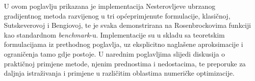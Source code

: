 U ovom poglavlju prikazana je implementacija Nesterovljeve ubrzanog gradijentnog metoda razvijenog u
tri općeprimjenute formulacije, klasičnoj, Sutskeverovoj i Bengiovoj, te je svaka demonstrirana na
Rosenbrockovima funkciji kao standardnom \textit{benchmark}-u.
Implementacije su u skladu sa teoretskim formulacijama iz prethodnog poglavlja, uz eksplicitno
naglašene aproksimacije i ograničenja tamo gdje postoje. U narednim poglavljima slijedi diskusija o praktičnoj primjene metode, njenim prednostima i nedostacima, te preporuke za daljnja istraživanja i primjene u različitim oblastima numeričke optimizacije.